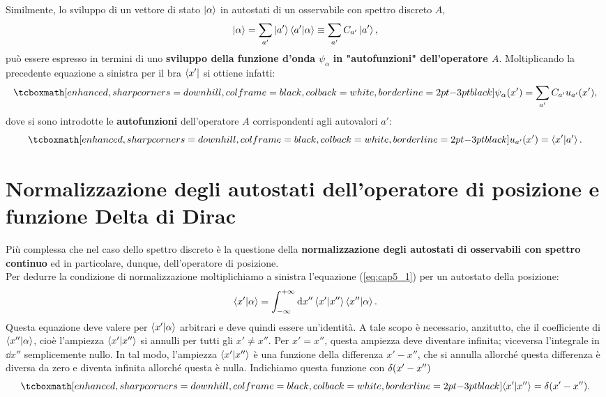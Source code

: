 \documentclass[a4paper,12pt,oneside]{book}
\begin{document}
Similmente, lo sviluppo di un vettore di stato $\ket{\alpha}$ in autostati di un osservabile con spettro discreto $A$,
	\begin{equation}
		\ket{\alpha} = \sum_{a'}\ket{a'}\braket{a'}{\alpha}\equiv \sum_{a'}C_{a'}\ket{a'} ,
	\end{equation}
può essere espresso in termini di uno \textbf{sviluppo della funzione d'onda} $\psi_{\alpha}$ \textbf{in "autofunzioni" dell'operatore $A$}. Moltiplicando la precedente equazione a sinistra per il bra $\bra{x'}$ si ottiene infatti:
	\begin{equation}
		\tcboxmath[enhanced, sharp corners=downhill, colframe=black, colback=white, borderline={2pt}{-3pt}{black}]{
			\psi_{\alpha}\qty(x') = \sum_{a'}C_{a'}u_{a'}\qty(x') ,
			}
	\end{equation}
dove si sono introdotte le \textbf{autofunzioni} dell'operatore $A$ corrispondenti agli autovalori $a'$:
	\begin{equation}
		\tcboxmath[enhanced, sharp corners=downhill, colframe=black, colback=white, borderline={2pt}{-3pt}{black}]{
			u_{a'}\qty(x') = \braket{x'}{a'} .
			}
	\end{equation}
\section[Normalizzazione degli autostati dell'operatore di posizione e funzione Delta di Dirac]{Normalizzazione degli autostati dell'operatore di posizione e funzione Delta di Dirac}
Più complessa che nel caso dello spettro discreto è la questione della \textbf{normalizzazione degli autostati di osservabili con spettro continuo}  ed in particolare, dunque, dell'operatore di posizione.\\

Per dedurre la condizione di normalizzazione moltiplichiamo a sinistra l'equazione (\ref{eq:cap5_1}) per un autostato della posizione:
	\begin{equation}
	 \label{eq:cap5_3}
		\braket{x'}{\alpha} = \int_{-\infty}^{+\infty}\dd{x''}\braket{x'}{x''}\braket{x''}{\alpha} .
	\end{equation}
Questa equazione deve valere per $\braket{x'}{\alpha}$ arbitrari e deve quindi essere un'identità. A tale scopo è necessario, anzitutto, che il coefficiente di $\braket{x''}{\alpha}$, cioè l'ampiezza $\braket{x'}{x''}$ si annulli per tutti gli $x'\neq x''$. Per $x'=x''$, questa ampiezza deve diventare infinita; viceversa l'integrale in $\dd{x''}$ semplicemente nullo. In tal modo, l'ampiezza $\braket{x'}{x''}$ è una funzione della differenza $x'-x''$, che si annulla allorché questa differenza è diversa da zero e diventa infinita allorché questa è nulla. Indichiamo questa funzione con $\delta\qty(x'-x'')$
	\begin{equation}
		\tcboxmath[enhanced, sharp corners=downhill, colframe=black, colback=white, borderline={2pt}{-3pt}{black}]{
			\braket{x'}{x''} = \delta\qty(x'-x'') .
			}
	\end{equation}\\
	
\end{document}
